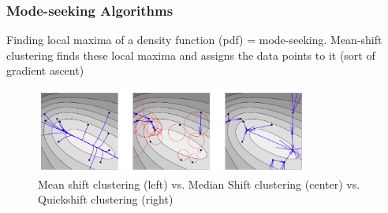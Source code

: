 

\subsubsection{Mode-seeking Algorithms} %
\label{sub:mode_finding_algorithms}

Finding local maxima of a density function (pdf) = mode-seeking.
Mean-shift clustering finds these local maxima and assigns the data points to it (sort of gradient ascent)

\begin{figure}[hbt]
    \centering
    \includegraphics[width=0.8\textwidth]{MeanshiftMedianshiftQuickshift}
    \caption{Mean shift clustering (left) vs. Median Shift clustering (center) vs. Quickshift clustering (right)}
    \label{fig:meanshift_median_shift_quickshift}
\end{figure}



